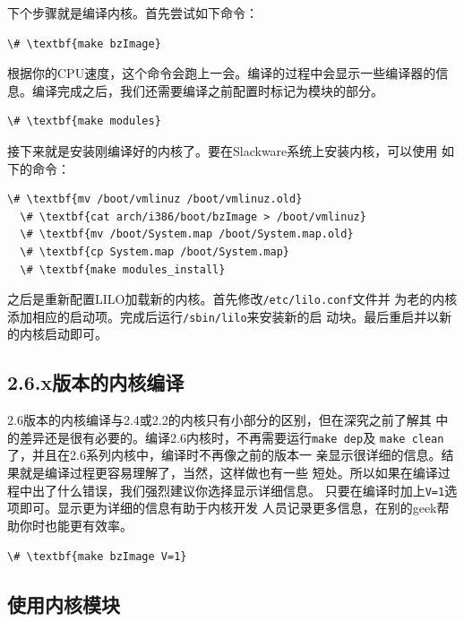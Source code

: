 下个步骤就是编译内核。首先尝试如下命令：
\begin{Verbatim}[frame=single, commandchars=\\\{\}]
  \# \textbf{make bzImage}
\end{Verbatim}

根据你的CPU速度，这个命令会跑上一会。编译的过程中会显示一些编译器的信
息。编译完成之后，我们还需要编译之前配置时标记为模块的部分。
\begin{Verbatim}[frame=single, commandchars=\\\{\}]
  \# \textbf{make modules}
\end{Verbatim}

接下来就是安装刚编译好的内核了。要在Slackware系统上安装内核，可以使用
如下的命令：
\begin{Verbatim}[frame=single, commandchars=\\\{\}]
  \# \textbf{mv /boot/vmlinuz /boot/vmlinuz.old}
  \# \textbf{cat arch/i386/boot/bzImage > /boot/vmlinuz}
  \# \textbf{mv /boot/System.map /boot/System.map.old}
  \# \textbf{cp System.map /boot/System.map}
  \# \textbf{make modules_install}
\end{Verbatim}
之后是重新配置LILO加载新的内核。首先修改\texttt{/etc/lilo.conf}文件并
为老的内核添加相应的启动项。完成后运行\texttt{/sbin/lilo}来安装新的启
动块。最后重启并以新的内核启动即可。


\subsection{2.6.x版本的内核编译}
\label{sec:systemConfig:selectingAKernel:2_6_x}
2.6版本的内核编译与2.4或2.2的内核只有小部分的区别，但在深究之前了解其
中的差异还是很有必要的。编译2.6内核时，不再需要运行\texttt{make dep}及
\texttt{make clean}了，并且在2.6系列内核中，编译时不再像之前的版本一
亲显示很详细的信息。结果就是编译过程更容易理解了，当然，这样做也有一些
短处。所以如果在编译过程中出了什么错误，我们强烈建议你选择显示详细信息。
只要在编译时加上\texttt{V=1}选项即可。显示更为详细的信息有助于内核开发
人员记录更多信息，在别的geek帮助你时也能更有效率。
\begin{Verbatim}[frame=single, commandchars=\\\{\}]
  \# \textbf{make bzImage V=1}
\end{Verbatim}


\subsection{使用内核模块}
\label{sec:systemConfig:selectingAKernel:usingKernelModules}

